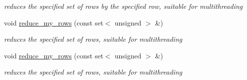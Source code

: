 \begin{DoxyCompactItemize}
\begin{DoxyCompactList}\small\item\em reduces the specified set of rows by the specified row, suitable for multithreading \end{DoxyCompactList}\item 
\mbox{\label{group___g_b_computation_a5fc6f2417153c7c1dc9a77a3b7f42597}} 
void \hyperlink{group___g_b_computation_a5fc6f2417153c7c1dc9a77a3b7f42597}{reduce\+\_\+my\+\_\+rows} (const set$<$ unsigned $>$ \&)
\begin{DoxyCompactList}\small\item\em reduces the specified set of rows, suitable for multithreading \end{DoxyCompactList}\item 
\mbox{\label{group___g_b_computation_a5fc6f2417153c7c1dc9a77a3b7f42597}} 
void \hyperlink{group___g_b_computation_a5fc6f2417153c7c1dc9a77a3b7f42597}{reduce\+\_\+my\+\_\+rows} (const set$<$ unsigned $>$ \&)
\begin{DoxyCompactList}\small\item\em reduces the specified set of rows, suitable for multithreading \end{DoxyCompactList}\end{DoxyCompactItemize}

